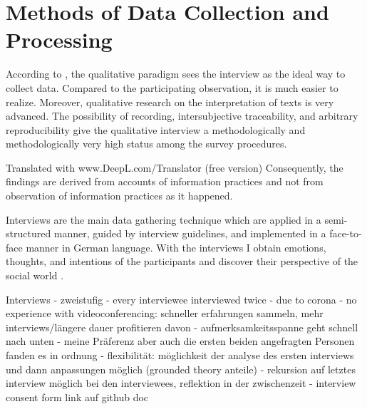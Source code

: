\documentclass[12pt,a4paper,titlepage,oneside,abstract=true,toc=listof,toc=bibliography]{scrreprt}
\begin{document}
\section{Methods of Data Collection and Processing}
According to \citet[p. 329]{Lamnek2005}, the qualitative paradigm sees the interview as the ideal way to collect data. Compared to the participating observation, it is much easier to realize. Moreover, qualitative research on the interpretation of texts is very advanced. The possibility of recording, intersubjective traceability, and arbitrary reproducibility give the qualitative interview a methodologically and methodologically very high status among the survey procedures.

Translated with www.DeepL.com/Translator (free version)
Consequently, the findings are derived from accounts of information practices and not from observation of information practices as it happened.



Interviews are the main data gathering technique which are applied in a semi-structured manner, guided by interview guidelines, and implemented in a face-to-face manner \citep{Bryman2004} in German language. With the interviews I obtain emotions, thoughts, and intentions of the participants and discover their perspective of the social world \citep{Patton2002}. 

Interviews - zweistufig
- every interviewee interviewed twice
- due to corona
- no experience with videoconferencing: schneller erfahrungen sammeln, mehr interviews/längere dauer profitieren davon
- aufmerksamkeitsspanne geht schnell nach unten
- meine Präferenz aber auch die ersten beiden angefragten Personen fanden es in ordnung
- flexibilität: möglichkeit der analyse des ersten interviews und dann anpassungen möglich (grounded theory anteile)
- rekursion auf letztes interview möglich bei den interviewees, reflektion in der zwischenzeit 
- interview consent form link auf github doc
\end{document}
